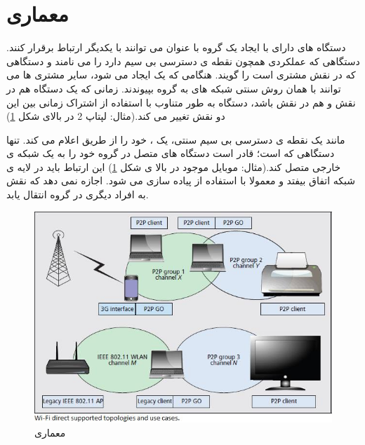 \section{معماری}
دستگاه های دارای 
با ایجاد یک گروه با عنوان 
می توانند با یکدیگر ارتباط برقرار کنند. دستگاهی که عملکردی همچون نقطه ی دسترسی بی سیم دارد را 
می نامند و دستگاهی که در نقش مشتری است را 
گویند.
هنگامی که یک 
ایجاد می شود، سایر مشتری ها می توانند با همان روش سنتی شبکه های 
به گروه بپیوندند. زمانی که یک دستگاه هم در نقش 
 و هم در نقش 
باشد، دستگاه به طور متناوب با استفاده از اشتراک زمانی 
بین این دو نقش تغییر می کند.(مثال: لپتاپ 2 در بالای شکل \ref{fig:WifiDirectArchitecture})

 مانند یک نقطه ی دسترسی بی سیم سنتی، یک
، خود را از طریق 
  اعلام می کند. تنها دستگاهی که 
 است؛ قادر است دستگاه های متصل در گروه خود را به یک شبکه ی خارجی متصل کند.(مثال: موبایل موجود در بالا ی شکل \ref{fig:WifiDirectArchitecture}) این ارتباط باید در لایه ی شبکه 
اتفاق بیفتد و معمولا با استفاده از 
پیاده سازی می شود.
اجازه نمی دهد که نقش 
به افراد دیگری در گروه انتقال یابد.

\begin{figure}
	\centerline{
	\includegraphics{images/wifidirectarchitecture.jpg}}
	\caption{معماری }
	\label{fig:WifiDirectArchitecture}
\end{figure}

